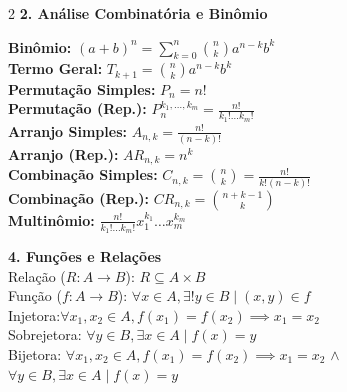 \documentclass[12pt,a4paper]{article}
\begin{document}
\begin{multicols}{2}
    \noindent \textbf{2. Análise Combinatória e Binômio}

    
    \textbf{Binômio:} $(a+b)^n = \sum_{k=0}^n \binom{n}{k} a^{n-k} b^k$ \\[0.15cm]
    \textbf{Termo Geral:} $T_{k+1} = \binom{n}{k} a^{n-k} b^k$ \\[0.15cm]
    \textbf{Permutação Simples:} $P_n = n!$ \\[0.15cm]
    \textbf{Permutação (Rep.):} $P_n^{k_1, \dots, k_m} = \frac{n!}{k_1! \dots k_m!}$ \\[0.15cm]
    \textbf{Arranjo Simples:} $A_{n,k} = \frac{n!}{(n-k)!}$ \\[0.15cm]
    \textbf{Arranjo (Rep.):} $AR_{n,k} = n^k$ \\[0.15cm]
    \textbf{Combinação Simples:} $C_{n,k} = \binom{n}{k} = \frac{n!}{k!(n-k)!}$ \\[0.15cm]
    \textbf{Combinação (Rep.):} $CR_{n,k} = \binom{n+k-1}{k}$ \\[0.15cm]
    \textbf{Multinômio:} $\frac{n!}{k_1! \dots k_m!} x_1^{k_1} \dots x_m^{k_m}$

    \vspace{0.3cm}
    \noindent \textbf{4. Funções e Relações}\\
    
    Relação ($R: A \to B$): $R \subseteq A \times B$ \\[0.1cm]
    Função ($f: A \to B$): $\forall x \in A, \exists! y \in B \mid (x, y) \in f$ \\[0.1cm]
    Injetora:$\forall x_1, x_2 \in A, f(x_1) = f(x_2) \implies x_1 = x_2$ \\[0.1cm]
    Sobrejetora: $\forall y \in B, \exists x \in A \mid f(x) = y$ \\[0.1cm]
    Bijetora: $\forall x_1, x_2 \in A, f(x_1) = f(x_2) \implies x_1 = x_2$ $\land$ $\forall y \in B, \exists x \in A \mid f(x) = y$

    \columnbreak


\end{multicols}
\end{document}

